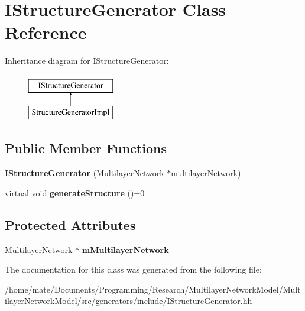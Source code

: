 \hypertarget{classIStructureGenerator}{}\section{I\+Structure\+Generator Class Reference}
\label{classIStructureGenerator}
Inheritance diagram for I\+Structure\+Generator\+:\begin{figure}[H]
\begin{center}
\leavevmode
\includegraphics[height=2.000000cm]{classIStructureGenerator}
\end{center}
\end{figure}
\subsection*{Public Member Functions}
\begin{DoxyCompactItemize}
\item 
{\bfseries I\+Structure\+Generator} (\hyperlink{classMultilayerNetwork}{Multilayer\+Network} $\ast$multilayer\+Network)\hypertarget{classIStructureGenerator_af1536f217b3898a794a23417b3a0a2ed}{}\label{classIStructureGenerator_af1536f217b3898a794a23417b3a0a2ed}

\item 
virtual void {\bfseries generate\+Structure} ()=0\hypertarget{classIStructureGenerator_a6fd7b5ad3b544e5069e83a5fc62e249c}{}\label{classIStructureGenerator_a6fd7b5ad3b544e5069e83a5fc62e249c}

\end{DoxyCompactItemize}
\subsection*{Protected Attributes}
\begin{DoxyCompactItemize}
\item 
\hyperlink{classMultilayerNetwork}{Multilayer\+Network} $\ast$ {\bfseries m\+Multilayer\+Network}\hypertarget{classIStructureGenerator_af3bd39449b5256b4e4505005c34f33c4}{}\label{classIStructureGenerator_af3bd39449b5256b4e4505005c34f33c4}

\end{DoxyCompactItemize}


The documentation for this class was generated from the following file\+:\begin{DoxyCompactItemize}
\item 
/home/mate/\+Documents/\+Programming/\+Research/\+Multilayer\+Network\+Model/\+Multilayer\+Network\+Model/src/generators/include/I\+Structure\+Generator.\+hh\end{DoxyCompactItemize}
